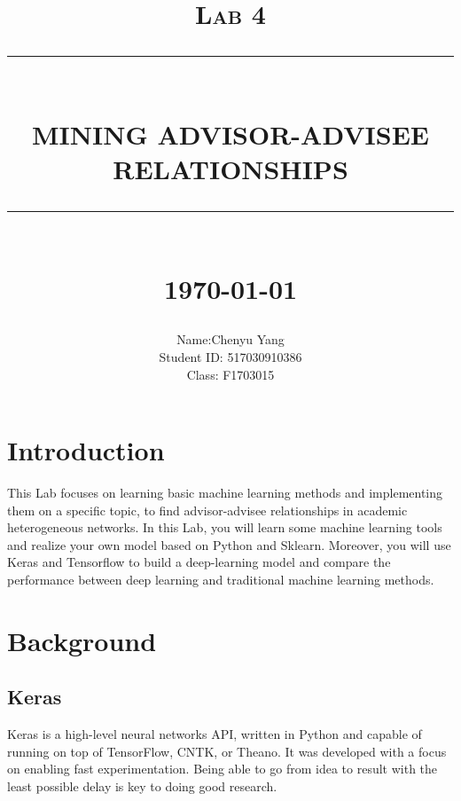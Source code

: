 \documentclass[12pt]{report}
\newcommand{\HRule}[1]{\rule{\linewidth}{#1}}
\begin{document}
\title{ \normalsize \textsc{Lab 4}
        \\ [2.0cm]
        \HRule{0.5pt} \\
        \LARGE \textbf{\uppercase{Mining Advisor-advisee Relationships}}
        \HRule{2pt} \\ [0.5cm]
        \normalsize \today \vspace*{5\baselineskip}}

\date{}

\author{
        Name:Chenyu Yang \\
        Student ID: 517030910386 \\ 
        Class: F1703015 }

\maketitle
\tableofcontents
\newpage

\sectionfont{\scshape}


\section{Introduction}
This Lab focuses on learning basic machine learning methods and implementing them on a specific topic, to find advisor-advisee relationships in academic heterogeneous networks. In this Lab, you will learn some machine learning tools and realize your own model based on Python and Sklearn. Moreover, you will use Keras and Tensorflow to build a deep-learning model and compare the performance between deep learning and traditional machine learning methods.
\section{Background}
\subsection{Keras}
Keras is a high-level neural networks API, written in Python and capable of running on top of TensorFlow, CNTK, or Theano. It was developed with a focus on enabling fast experimentation. Being able to go from idea to result with the least possible delay is key to doing good research.
\end{document}
